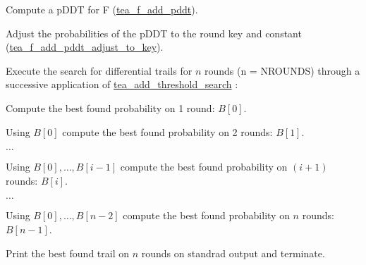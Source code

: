 \begin{DoxyEnumerate}
\item \-Compute a p\-D\-D\-T for \-F (\hyperlink{tea-f-add-pddt_8hh_af962bfb5724a4f1dd45fdb2fdeac49f4}{tea\-\_\-f\-\_\-add\-\_\-pddt}).
\item \-Adjust the probabilities of the p\-D\-D\-T to the round key and constant (\hyperlink{tea-f-add-pddt_8hh_aa60ac75c659872644ff116ea451bed41}{tea\-\_\-f\-\_\-add\-\_\-pddt\-\_\-adjust\-\_\-to\-\_\-key}).
\item \-Execute the search for differential trails for $n$ rounds (n = \-N\-R\-O\-U\-N\-D\-S) through a successive application of \hyperlink{tea-add-threshold-search_8cc_ab59db616cde68bf9245c7d24c98e3a6c}{tea\-\_\-add\-\_\-threshold\-\_\-search} \-:
\begin{DoxyItemize}
\item \-Compute the best found probability on 1 round\-: $B[0]$.
\item \-Using $B[0]$ compute the best found probability on 2 rounds\-: $B[1]$.
\item $\ldots$
\item \-Using $B[0],\ldots,B[i-1]$ compute the best found probability on $(i+1)$ rounds\-: $B[i]$.
\item $\ldots$
\item \-Using $B[0],\ldots,B[n-2]$ compute the best found probability on $n$ rounds\-: $B[n-1]$.
\end{DoxyItemize}
\item \-Print the best found trail on $n$ rounds on standrad output and terminate.
\end{DoxyEnumerate}

